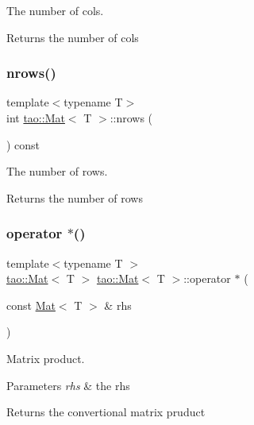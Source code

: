 The number of cols. 

\begin{DoxyReturn}{Returns}
the number of cols 
\end{DoxyReturn}
\mbox{\label{classtao_1_1_mat_a6391b9b7e8b36ceeb341e8bd94952d5c}} 
\subsubsection{\texorpdfstring{nrows()}{nrows()}}
{\footnotesize\ttfamily template$<$typename T$>$ \\
int \mbox{\hyperlink{classtao_1_1_mat}{tao\+::\+Mat}}$<$ T $>$\+::nrows (\begin{DoxyParamCaption}{ }\end{DoxyParamCaption}) const\hspace{0.3cm}{\ttfamily [inline]}}



The number of rows. 

\begin{DoxyReturn}{Returns}
the number of rows 
\end{DoxyReturn}
\mbox{\label{classtao_1_1_mat_ad328f559aab180d67e0fb4558c6c92a0}} 
\subsubsection{\texorpdfstring{operator $\ast$()}{operator *()}\hspace{0.1cm}{\footnotesize\ttfamily [1/2]}}
{\footnotesize\ttfamily template$<$typename T $>$ \\
\mbox{\hyperlink{classtao_1_1_mat}{tao\+::\+Mat}}$<$ T $>$ \mbox{\hyperlink{classtao_1_1_mat}{tao\+::\+Mat}}$<$ T $>$\+::operator $\ast$ (\begin{DoxyParamCaption}\item[{const \mbox{\hyperlink{classtao_1_1_mat}{Mat}}$<$ T $>$ \&}]{rhs }\end{DoxyParamCaption})}



Matrix product. 


\begin{DoxyParams}{Parameters}
{\em rhs} & the rhs \\
\hline
\end{DoxyParams}
\begin{DoxyReturn}{Returns}
the convertional matrix pruduct 
\end{DoxyReturn}
\mbox{\label{classtao_1_1_mat_a83de238ae44b6cf2bcaa342dd514f333}} 
